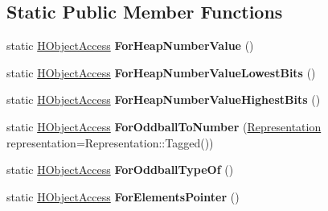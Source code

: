 \subsection*{Static Public Member Functions}
\begin{DoxyCompactItemize}
\item 
static \hyperlink{classv8_1_1internal_1_1_h_object_access}{H\+Object\+Access} {\bfseries For\+Heap\+Number\+Value} ()\hypertarget{classv8_1_1internal_1_1_h_object_access_a9618f2d162b64f7fbad61f753d1d23c5}{}\label{classv8_1_1internal_1_1_h_object_access_a9618f2d162b64f7fbad61f753d1d23c5}

\item 
static \hyperlink{classv8_1_1internal_1_1_h_object_access}{H\+Object\+Access} {\bfseries For\+Heap\+Number\+Value\+Lowest\+Bits} ()\hypertarget{classv8_1_1internal_1_1_h_object_access_a1f8c4478fe9e4634d812d289f7476c64}{}\label{classv8_1_1internal_1_1_h_object_access_a1f8c4478fe9e4634d812d289f7476c64}

\item 
static \hyperlink{classv8_1_1internal_1_1_h_object_access}{H\+Object\+Access} {\bfseries For\+Heap\+Number\+Value\+Highest\+Bits} ()\hypertarget{classv8_1_1internal_1_1_h_object_access_a7e187642e78c465131d3095a7f2bd116}{}\label{classv8_1_1internal_1_1_h_object_access_a7e187642e78c465131d3095a7f2bd116}

\item 
static \hyperlink{classv8_1_1internal_1_1_h_object_access}{H\+Object\+Access} {\bfseries For\+Oddball\+To\+Number} (\hyperlink{classv8_1_1internal_1_1_representation}{Representation} representation=Representation\+::\+Tagged())\hypertarget{classv8_1_1internal_1_1_h_object_access_addc28375ab4863a949b72920478365c2}{}\label{classv8_1_1internal_1_1_h_object_access_addc28375ab4863a949b72920478365c2}

\item 
static \hyperlink{classv8_1_1internal_1_1_h_object_access}{H\+Object\+Access} {\bfseries For\+Oddball\+Type\+Of} ()\hypertarget{classv8_1_1internal_1_1_h_object_access_a1a2f07f0795db6a9893912d1ca398938}{}\label{classv8_1_1internal_1_1_h_object_access_a1a2f07f0795db6a9893912d1ca398938}

\item 
static \hyperlink{classv8_1_1internal_1_1_h_object_access}{H\+Object\+Access} {\bfseries For\+Elements\+Pointer} ()\hypertarget{classv8_1_1internal_1_1_h_object_access_a826fb6f022eac03a30804f57ce7f8e97}{}\label{classv8_1_1internal_1_1_h_object_access_a826fb6f022eac03a30804f57ce7f8e97}


\end{DoxyCompactItemize}

